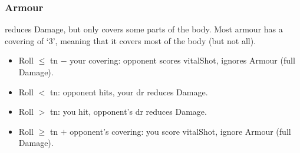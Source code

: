 \subsubsection{Armour}
reduces Damage, but only covers some parts of the body.
Most armour has a \gls{covering} of `3', meaning that it covers most of the body (but not all).

\begin{itemize}
  \item Roll $\leq$ \gls{tn} $-$ your \gls{covering}: opponent scores \gls{vitalShot}, ignores Armour (full Damage).
  \item Roll $<$ \gls{tn}: opponent hits, your \gls{dr} reduces Damage.
  \item Roll $>$ \gls{tn}: you hit, opponent's \gls{dr} reduces Damage.
  \item Roll $\geq$ \gls{tn} $+$ opponent's \gls{covering}: you score \gls{vitalShot}, ignore Armour (full Damage).
\end{itemize}
